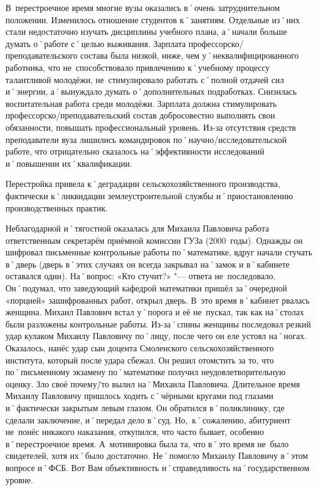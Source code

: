 В~перестроечное время многие вузы оказались в˚очень затруднительном положении. Изменилось отношение студентов к˚занятиям. Отдельные из˚них стали недостаточно изучать дисциплины учебного плана, а˚начали больше думать о˚работе с˚целью выживания. Зарплата профессорско\-/преподавательского состава была низкой, ниже, чем у˚неквалифицированного работника, что не~способствовало привлечению к˚учебному процессу талантливой молодёжи, не~стимулировало работать с˚полной отдачей сил и˚энергии, а˚вынуждало думать о˚дополнительных подработках. Снизилась воспитательная работа среди молодёжи. Зарплата должна стимулировать профессорско\-/преподавательский состав добросовестно выполнять свои обязанности, повышать профессиональный уровень. Из-за отсутствия средств преподаватели вуза лишились командировок по˚научно\-/исследовательской работе, что отрицательно сказалось на˚эффективности исследований и˚повышении их˚квалификации.

Перестройка привела к˚деградации сельскохозяйственного производства, фактически к˚ликвидации землеустроительной службы и˚приостановлению производственных практик. 

Неблагодарной и˚тягостной оказалась для Михаила Павловича работа ответственным секретарём приёмной комиссии ГУЗа (2000~годы). Однажды он шифровал письменные контрольные работы по˚математике, вдруг начали стучать в˚дверь (дверь в˚этих случаях он всегда закрывал на˚замок и в˚кабинете оставался один). На˚вопрос: «Кто стучит?» "--- ответа не~последовало. Он˚подумал, что заведующий кафедрой математики пришёл за˚очередной «порцией» зашифрованных работ, открыл дверь. В~это время в˚кабинет рвалась женщина. Михаил Павлович встал у˚порога и её не~пускал, так как на˚столах были разложены контрольные работы. Из-за˚спины женщины последовал резкий удар кулаком Михаилу Павловичу по˚лицу, после чего он еле устоял на˚ногах. Оказалось, нанёс удар сын доцента Смоленского сельскохозяйственного института, который после удара сбежал. Он решил отомстить за то, что по˚письменному экзамену по˚математике получил неудовлетворительную оценку. Зло своё почему\=/то вылил на˚Михаила Павловича. Длительное время Михаилу Павловичу пришлось ходить с˚чёрными кругами под глазами и˚фактически закрытым левым глазом. Он обратился в˚поликлинику, где сделали заключение, и˚передал дело в˚суд. Но,~к˚сожалению, абитуриент не~понёс никакого наказания, откупился, что часто бывает, особенно в˚перестроечное время. А~мотивировка была та, что в˚это время не~было свидетелей, хотя их˚было достаточно. Не˚помогло Михаилу Павловичу в˚этом вопросе и˚ФСБ. Вот Вам объективность и˚справедливость на˚государственном уровне.

